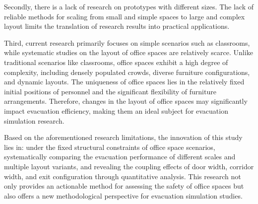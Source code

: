 Secondly, there is a lack of research on prototypes with different sizes. The lack of reliable methods for scaling from small and simple spaces to large and complex layout limits the translation of research results into practical applications.

Third, current research primarily focuses on simple scenarios such as classrooms, while systematic studies on the layout of office spaces are relatively scarce. Unlike traditional scenarios like classrooms, office spaces exhibit a high degree of complexity, including densely populated crowds, diverse furniture configurations, and dynamic layouts. The uniqueness of office spaces lies in the relatively fixed initial positions of personnel and the significant flexibility of furniture arrangements. Therefore, changes in the layout of office spaces may significantly impact evacuation efficiency, making them an ideal subject for evacuation simulation research.

Based on the aforementioned research limitations, the innovation of this study lies in: under the fixed structural constraints of office space scenarios, systematically comparing the evacuation performance of different scales and multiple layout variants, and revealing the coupling effects of door width, corridor width, and exit configuration through quantitative analysis. This research not only provides an actionable method for assessing the safety of office spaces but also offers a new methodological perspective for evacuation simulation studies.